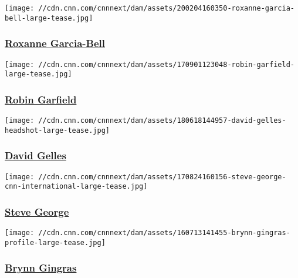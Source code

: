 \href{/profiles/roxanne-garcia-bell}{}

\texttt{[image: //cdn.cnn.com/cnnnext/dam/assets/200204160350-roxanne-garcia-bell-large-tease.jpg]}

\hypertarget{roxanne-garcia-bell}{%
\subsubsection{\texorpdfstring{\href{/profiles/roxanne-garcia-bell}{Roxanne
Garcia-Bell}}{Roxanne Garcia-Bell}}\label{roxanne-garcia-bell}}

\href{/profiles/robin-garfield-profile}{}

\texttt{[image: //cdn.cnn.com/cnnnext/dam/assets/170901123048-robin-garfield-large-tease.jpg]}

\hypertarget{robin-garfield}{%
\subsubsection{\texorpdfstring{\href{/profiles/robin-garfield-profile}{Robin
Garfield}}{Robin Garfield}}\label{robin-garfield}}

\href{/profiles/david-gelles}{}

\texttt{[image: //cdn.cnn.com/cnnnext/dam/assets/180618144957-david-gelles-headshot-large-tease.jpg]}

\hypertarget{david-gelles}{%
\subsubsection{\texorpdfstring{\href{/profiles/david-gelles}{David
Gelles}}{David Gelles}}\label{david-gelles}}

\href{/profiles/steve-george}{}

\texttt{[image: //cdn.cnn.com/cnnnext/dam/assets/170824160156-steve-george-cnn-international-large-tease.jpg]}

\hypertarget{steve-george-}{%
\subsubsection{\texorpdfstring{\href{/profiles/steve-george}{Steve
George }}{Steve George }}\label{steve-george-}}

\href{/profiles/brynn-gingras-profile}{}

\texttt{[image: //cdn.cnn.com/cnnnext/dam/assets/160713141455-brynn-gingras-profile-large-tease.jpg]}

\hypertarget{brynn-gingras}{%
\subsubsection{\texorpdfstring{\href{/profiles/brynn-gingras-profile}{Brynn
Gingras}}{Brynn Gingras}}\label{brynn-gingras}}

